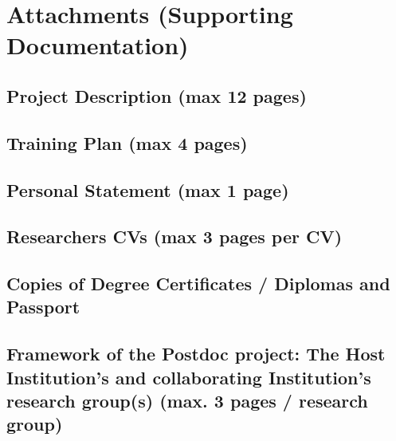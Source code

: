 \documentclass[11pt,twoside,a4paper]{article}
\begin{document}
\section{Attachments (Supporting Documentation)}

\subsection{Project Description (max 12 pages)}



\subsection{Training Plan (max 4 pages)}

\subsection{Personal Statement (max 1 page)}

\subsection{Researchers CVs (max 3 pages per CV)}



\subsection{Copies of Degree Certificates / Diplomas and Passport}


\subsection{Framework of the Postdoc project: The Host Institution's and
  collaborating Institution's research group(s) (max. 3 pages / research group)}
\end{document}
